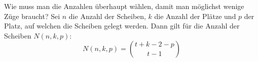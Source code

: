 \begin{frame}{Wie muss man die Anzahlen überhaupt wählen, damit man möglichst wenige Züge braucht?}
    Sei $n$ die Anzahl der Scheiben, $k$ die Anzahl der Plätze und $p$ der Platz, auf welchen die Scheiben gelegt werden.
    Dann gilt für die Anzahl der Scheiben $N(n,k,p)$:
    \[N(n,k,p)=\binom{t+k-2-p}{t-1}\]
\end{frame}